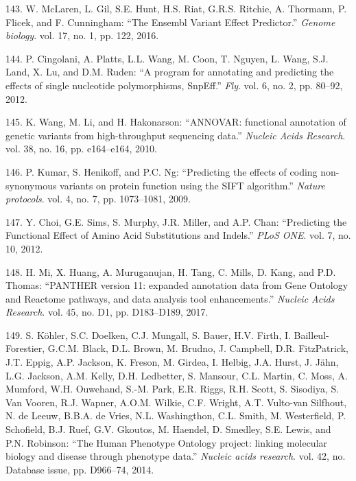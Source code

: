 \documentclass[12pt,twoside]{reedthesis}
\theoremstyle{definition}
\theoremstyle{definition}
\theoremstyle{remark}
\begin{document}
  \hypertarget{ref-McLaren2016}{}
  143. W. McLaren, L. Gil, S.E. Hunt, H.S. Riat, G.R.S. Ritchie, A.
  Thormann, P. Flicek, and F. Cunningham: ``The Ensembl Variant Effect
  Predictor.'' \emph{Genome biology}. vol. 17, no. 1, pp. 122, 2016.
  
  \hypertarget{ref-Cingolani2012}{}
  144. P. Cingolani, A. Platts, L.L. Wang, M. Coon, T. Nguyen, L. Wang,
  S.J. Land, X. Lu, and D.M. Ruden: ``A program for annotating and
  predicting the effects of single nucleotide polymorphisms, SnpEff.''
  \emph{Fly}. vol. 6, no. 2, pp. 80--92, 2012.
  
  \hypertarget{ref-Wang2010}{}
  145. K. Wang, M. Li, and H. Hakonarson: ``ANNOVAR: functional annotation
  of genetic variants from high-throughput sequencing data.''
  \emph{Nucleic Acids Research}. vol. 38, no. 16, pp. e164--e164, 2010.
  
  \hypertarget{ref-Kumar2009}{}
  146. P. Kumar, S. Henikoff, and P.C. Ng: ``Predicting the effects of
  coding non-synonymous variants on protein function using the SIFT
  algorithm.'' \emph{Nature protocols}. vol. 4, no. 7, pp. 1073--1081,
  2009.
  
  \hypertarget{ref-Choi2012}{}
  147. Y. Choi, G.E. Sims, S. Murphy, J.R. Miller, and A.P. Chan:
  ``Predicting the Functional Effect of Amino Acid Substitutions and
  Indels.'' \emph{PLoS ONE}. vol. 7, no. 10, 2012.
  
  \hypertarget{ref-Mi2017}{}
  148. H. Mi, X. Huang, A. Muruganujan, H. Tang, C. Mills, D. Kang, and
  P.D. Thomas: ``PANTHER version 11: expanded annotation data from Gene
  Ontology and Reactome pathways, and data analysis tool enhancements.''
  \emph{Nucleic Acids Research}. vol. 45, no. D1, pp. D183--D189, 2017.
  
  \hypertarget{ref-Kohler2014}{}
  149. S. Köhler, S.C. Doelken, C.J. Mungall, S. Bauer, H.V. Firth, I.
  Bailleul-Forestier, G.C.M. Black, D.L. Brown, M. Brudno, J. Campbell,
  D.R. FitzPatrick, J.T. Eppig, A.P. Jackson, K. Freson, M. Girdea, I.
  Helbig, J.A. Hurst, J. Jähn, L.G. Jackson, A.M. Kelly, D.H. Ledbetter,
  S. Mansour, C.L. Martin, C. Moss, A. Mumford, W.H. Ouwehand, S.-M. Park,
  E.R. Riggs, R.H. Scott, S. Sisodiya, S. Van Vooren, R.J. Wapner, A.O.M.
  Wilkie, C.F. Wright, A.T. Vulto-van Silfhout, N. de Leeuw, B.B.A. de
  Vries, N.L. Washingthon, C.L. Smith, M. Westerfield, P. Schofield, B.J.
  Ruef, G.V. Gkoutos, M. Haendel, D. Smedley, S.E. Lewis, and P.N.
  Robinson: ``The Human Phenotype Ontology project: linking molecular
  biology and disease through phenotype data.'' \emph{Nucleic acids
  research}. vol. 42, no. Database issue, pp. D966--74, 2014.
  
\end{document}
